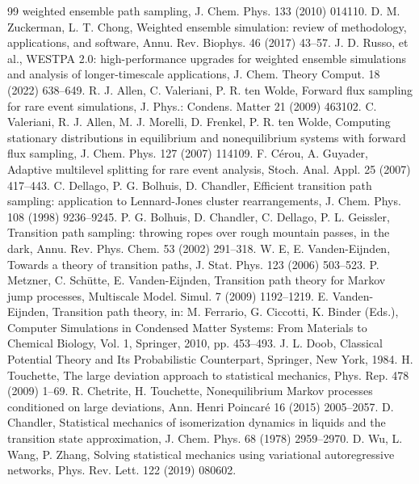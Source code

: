 \documentclass[a4paper,fleqn]{cas-sc}
\begin{document}
\begin{thebibliography}{99}
weighted ensemble path sampling, J. Chem. Phys. 133 (2010) 014110.
 D. M. Zuckerman, L. T. Chong, Weighted ensemble simulation: review of
methodology, applications, and software, Annu. Rev. Biophys. 46 (2017) 43--57.
 J. D. Russo, et al., WESTPA 2.0: high-performance upgrades for weighted
ensemble simulations and analysis of longer-timescale applications, J. Chem. Theory Comput. 18
(2022) 638--649.
 R. J. Allen, C. Valeriani, P. R. ten Wolde, Forward flux sampling for rare
event simulations, J. Phys.: Condens. Matter 21 (2009) 463102.
 C. Valeriani, R. J. Allen, M. J. Morelli, D. Frenkel, P. R. ten Wolde,
Computing stationary distributions in equilibrium and nonequilibrium systems with forward flux
sampling, J. Chem. Phys. 127 (2007) 114109.
 F. C\'erou, A. Guyader, Adaptive multilevel splitting for rare event analysis,
Stoch. Anal. Appl. 25 (2007) 417--443.
 C. Dellago, P. G. Bolhuis, D. Chandler, Efficient transition path sampling:
application to Lennard-Jones cluster rearrangements, J. Chem. Phys. 108 (1998) 9236--9245.
 P. G. Bolhuis, D. Chandler, C. Dellago, P. L. Geissler, Transition path
sampling: throwing ropes over rough mountain passes, in the dark, Annu. Rev. Phys. Chem. 53 (2002)
291--318.
 W. E, E. Vanden-Eijnden, Towards a theory of transition paths, J. Stat. Phys. 123
(2006) 503--523.
 P. Metzner, C. Sch\"utte, E. Vanden-Eijnden, Transition path theory for
Markov jump processes, Multiscale Model. Simul. 7 (2009) 1192--1219.
 E. Vanden-Eijnden, Transition path theory, in: M. Ferrario,
G. Ciccotti, K. Binder (Eds.), Computer Simulations in Condensed Matter Systems: From Materials to
Chemical Biology, Vol. 1, Springer, 2010, pp. 453--493.
 J. L. Doob, Classical Potential Theory and Its Probabilistic Counterpart,
Springer, New York, 1984.
 H. Touchette, The large deviation approach to statistical mechanics,
Phys. Rep. 478 (2009) 1--69.
 R. Chetrite, H. Touchette, Nonequilibrium Markov processes conditioned on
large deviations, Ann. Henri Poincar\'e 16 (2015) 2005--2057.
 D. Chandler, Statistical mechanics of isomerization dynamics in liquids and
the transition state approximation, J. Chem. Phys. 68 (1978) 2959--2970.
 D. Wu, L. Wang, P. Zhang, Solving statistical mechanics using variational
autoregressive networks, Phys. Rev. Lett. 122 (2019) 080602.

\end{thebibliography}
\end{document}
